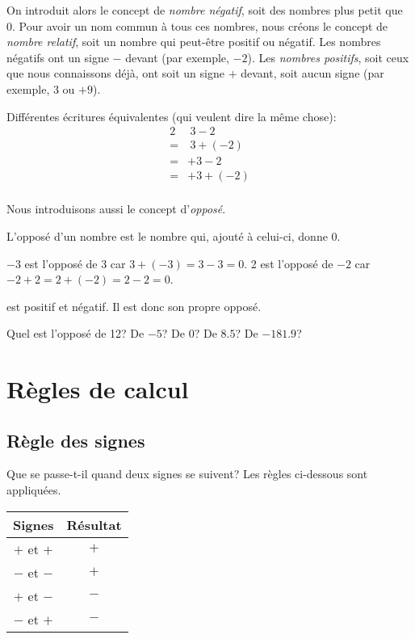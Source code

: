 \noindent On introduit alors le concept de \emph{nombre négatif}, soit des nombres plus petit que 0. Pour avoir un nom commun à tous ces nombres, nous créons le concept de \emph{nombre relatif}, soit un nombre qui peut-être positif ou négatif. Les nombres négatifs ont un signe $-$ devant (par exemple, $-2$). Les \emph{nombres positifs}, soit ceux que nous connaissons déjà, ont soit un signe $+$ devant, soit aucun signe (par exemple, 3 ou $+9$).

\begin{exemple}
	Différentes écritures équivalentes (qui veulent dire la même chose):
	\begin{alignat*}{2}
		& \ 3 - 2\\
		= &\ 3 + (-2)\\
		= & +3 - 2\\
		= & +3 + (-2)\\
	\end{alignat*}
\end{exemple}
\noindent Nous introduisons aussi le concept d'\emph{opposé}.

\begin{definitionfr}
	L'opposé d'un nombre est le nombre qui, ajouté à celui-ci, donne 0.
\end{definitionfr}

\begin{exemple}
	$-3$ est l'opposé de 3 car $3 + (-3) = 3 -3 = 0$. 2 est l'opposé de $-2$ car $-2 + 2 = 2 + (-2) = 2 - 2 = 0$.
\end{exemple}

 est positif et négatif. Il est donc son propre opposé.

\begin{exercicefr}
	Quel est l'opposé de 12? De $-5$? De 0? De $8.5$? De $-181.9$?
\end{exercicefr}




\section{Règles de calcul}

\subsection{Règle des signes}

Que se passe-t-il quand deux signes se suivent? Les règles ci-dessous sont appliquées.

\begin{center}
	\begin{table}[h]
		\centering
		\begin{tabular}{|c|c|}
		\hline
		\textbf{Signes} & \textbf{Résultat} \\ \hline
		$+$ et $+$ & $+$ \\ \hline
		$-$ et $-$ & $+$ \\ \hline
		$+$ et $-$ & $-$ \\ \hline
		$-$ et $+$ & $-$ \\ \hline
		\end{tabular}
		\label{reglesdessignes}
		\end{table}
\end{center}

